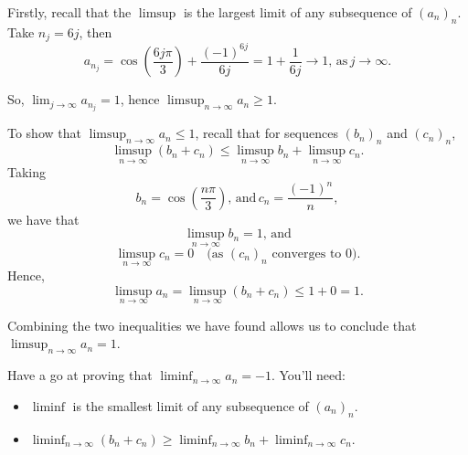 \documentclass[
  17pt,
  a4paper]{extarticle}
\providecommand{\tightlist}{%
  \setlength{\itemsep}{0pt}\setlength{\parskip}{0pt}}
\theoremstyle{plain}
\theoremstyle{plain}
\theoremstyle{plain}
\theoremstyle{plain}
\theoremstyle{plain}
\theoremstyle{definition}
\theoremstyle{definition}
\theoremstyle{definition}
\theoremstyle{remark}
\renewcommand{\;}{\,}
\begin{document}
Firstly, recall that the \(\limsup\) is the largest limit of any subsequence of \((a_n)_n\). Take \(n_j = 6j\), then \[a_{n_j} = \cos\left(\frac{6j\pi}{3}\right) + \frac{(-1)^{6j}}{6j} = 1 + \frac{1}{6j} \to 1, \; \text{as} \; j \to \infty.\]

So, \(\lim_{j \to \infty} a_{n_j} = 1\), hence \(\limsup_{n \to \infty} a_n \geq 1\).

To show that \(\limsup_{n \to \infty} a_n \leq 1\), recall that for sequences \((b_n)_n\) and \((c_n)_n\), \[\limsup_{n \to \infty}(b_n + c_n) \leq \limsup_{n \to \infty}b_n + \limsup_{n \to \infty}c_n.\] Taking \[b_n = \cos\left(\frac{n\pi}{3}\right), \; \text{and} \; c_n = \frac{(-1)^n}{n},\] we have that \[\limsup_{n \to \infty} b_n = 1, \; \text{and}\] \[\limsup_{n \to \infty} c_n = 0 \quad \text{(as $(c_n)_n$ converges to $0$)}.\] Hence,
\[\limsup_{n \to \infty} a_n = \limsup_{n \to \infty}(b_n + c_n) \leq 1 + 0 = 1.\]

Combining the two inequalities we have found allows us to conclude that \(\limsup_{n \to \infty} a_n = 1.\)

Have a go at proving that \(\liminf_{n \to \infty} a_n = -1\). You'll need:

\begin{itemize}
\tightlist
\item
  \(\liminf\) is the smallest limit of any subsequence of \((a_n)_n\).
\item
  \(\liminf_{n \to \infty}(b_n + c_n) \geq \liminf_{n \to \infty}b_n + \liminf_{n \to \infty}c_n.\)
\end{itemize}
\end{document}
